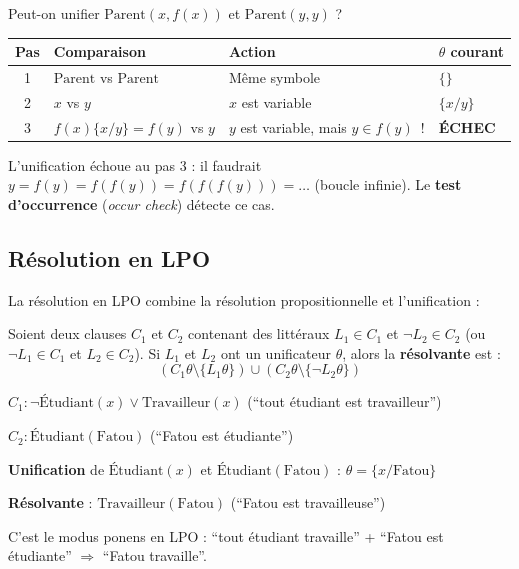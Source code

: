 \documentclass[11pt,a4paper]{article}
\begin{document}
\begin{exemplebox}
Peut-on unifier $\text{Parent}(x, f(x))$ et $\text{Parent}(y, y)$ ?

\begin{center}
\begin{tabular}{clll}
\toprule
\textbf{Pas} & \textbf{Comparaison} & \textbf{Action} & \textbf{$\theta$ courant} \\
\midrule
1 & $\text{Parent}$ vs $\text{Parent}$ & Même symbole & $\{\}$ \\
2 & $x$ vs $y$ & $x$ est variable & $\{x/y\}$ \\
3 & $f(x)\{x/y\} = f(y)$ vs $y$ & $y$ est variable, mais $y \in f(y)$~! & \textbf{ÉCHEC} \\
\bottomrule
\end{tabular}
\end{center}

L'unification échoue au pas 3 : il faudrait $y = f(y) = f(f(y)) = f(f(f(y))) = \ldots$ (boucle infinie). Le \textbf{test d'occurrence} (\textit{occur check}) détecte ce cas.
\end{exemplebox}

\subsection{Résolution en LPO}

La résolution en LPO combine la résolution propositionnelle et l'unification :

\begin{theorembox}
Soient deux clauses $C_1$ et $C_2$ contenant des littéraux $L_1 \in C_1$ et $\neg L_2 \in C_2$ (ou $\neg L_1 \in C_1$ et $L_2 \in C_2$). Si $L_1$ et $L_2$ ont un unificateur $\theta$, alors la \textbf{résolvante} est :
$$(C_1\theta \setminus \{L_1\theta\}) \cup (C_2\theta \setminus \{\neg L_2\theta\})$$
\end{theorembox}

\begin{exemplebox}
$C_1 : \neg\text{Étudiant}(x) \lor \text{Travailleur}(x)$ \quad (``tout étudiant est travailleur'')

$C_2 : \text{Étudiant}(\text{Fatou})$ \quad (``Fatou est étudiante'')

\textbf{Unification} de $\text{Étudiant}(x)$ et $\text{Étudiant}(\text{Fatou})$ : $\theta = \{x/\text{Fatou}\}$

\textbf{Résolvante} : $\text{Travailleur}(\text{Fatou})$ \quad (``Fatou est travailleuse'')

C'est le modus ponens en LPO : ``tout étudiant travaille'' + ``Fatou est étudiante'' $\Rightarrow$ ``Fatou travaille''.
\end{exemplebox}
\end{document}
